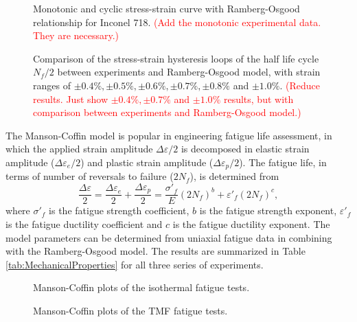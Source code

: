 \documentclass[preprint,5p,twocolumn,11pt,sort&compress]{elsarticle}
\newcommand{\marked}[1]{\textcolor{red}{#1}}
\begin{document}
\begin{figure}[!htp]
\caption{Monotonic and cyclic stress-strain curve with Ramberg-Osgood relationship for Inconel 718. \marked{(Add the monotonic experimental data. They are necessary.)}}
\label{Fig:plot_monotonic_cyclic_osgood}
\end{figure}


\begin{figure}[!htp]
\caption{Comparison of the stress-strain hysteresis loops of the half life cycle $N_f/2$ between experiments and Ramberg-Osgood model, with strain ranges of $\pm0.4\%, \pm0.5\%, \pm0.6\%, \pm0.7\%, \pm0.8\%$ and $\pm1.0\%$. \marked{(Reduce results. Just show  $\pm0.4\%,  \pm0.7\%$ and $\pm1.0\%$ results, but with comparison between experiments and Ramberg-Osgood model.)}}
\label{Fig:plot_exp_half_life_cycle}
\end{figure}


The Manson-Coffin model is popular in engineering fatigue life assessment, in which the applied strain amplitude $\Delta \varepsilon/2$ is decomposed in elastic strain amplitude ($\Delta \varepsilon_e/2$) and plastic strain amplitude ($\Delta \varepsilon_p/2$). The fatigue life, in terms of number of reversals to failure ($2N_f$), is determined from
\begin{equation}
\frac{{\Delta \varepsilon }}{2} = \frac{{\Delta {\varepsilon _e}}}{2} + \frac{{\Delta {\varepsilon _p}}}{2} = \frac{{{{\sigma '}_f}}}{E}{\left( {2{N_f}} \right)^b} + {\varepsilon '_f}{\left( {2{N_f}} \right)^c},
\label{Equ:CoffinManson}
\end{equation}
where ${{{\sigma '}_f}}$ is the fatigue strength coefficient, $b$ is the fatigue strength exponent, ${{{\varepsilon '}_f}}$ is the fatigue ductility coefficient and $c$ is the fatigue ductility exponent. The model parameters can be determined from uniaxial fatigue data in combining with the Ramberg-Osgood model. The results are summarized in Table \ref{tab:MechanicalProperties} for all three series of experiments.

\begin{figure}[!htp]
\caption{Manson-Coffin plots of the isothermal fatigue tests.}
\label{Fig:Baseline}
\end{figure}

\begin{figure}[!htp]
\caption{Manson-Coffin plots of the TMF fatigue tests.}
\label{Fig:plot_exp_fatigue_life}
\end{figure}
\end{document}
